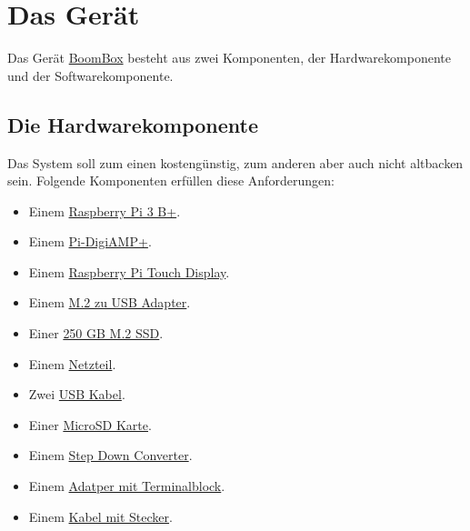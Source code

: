\documentclass[12pt,a4paper]{article}
\newcommand{\bb}{\href{https://github.com/ThirtySomething/BoomBox}{BoomBox}}
\newcommand{\rpi}{\href{https://www.raspberrypi.org/}{Raspberry Pi}\index{Raspberry Pi}}
\begin{document}
\section{Das Gerät}

Das Gerät \bb{} besteht aus zwei Komponenten, der Hardwarekomponente und der
Softwarekomponente.

\subsection{Die Hardwarekomponente}

Das System soll zum einen kostengünstig, zum anderen aber auch nicht altbacken
sein. Folgende Komponenten erfüllen diese Anforderungen:

\begin{itemize}
    \item Einem \href{https://www.raspberrypi.org/products/raspberry-pi-3-model-b-plus/}{\rpi{} 3 B+}.
    \item Einem \href{http://iqaudio.co.uk/hats/9-pi-digiamp.html}{Pi-DigiAMP+}.
    \item Einem \href{https://www.raspberrypi.org/products/raspberry-pi-touch-display/}{\rpi{} Touch Display}.
    \item Einem \href{https://www.conrad.de/de/m2-sata-ssd-erweiterungs-platine-fuer-den-raspberry-pi-1487097.html}{M.2 zu USB Adapter}.
    \item Einer \href{https://www.wd.com/de-de/products/internal-ssd/wd-blue-3d-nand-sata-ssd.html}{250 GB M.2 SSD}.
    \item Einem \href{https://www.amazon.de/gp/product/B002JIGJ4M/ref=ppx_yo_dt_b_asin_title_o04_s00?ie=UTF8&psc=1}{Netzteil}.
    \item Zwei \href{https://www.amazon.de/gp/product/B01GJC4WRO/ref=ppx_yo_dt_b_asin_title_o07_s00?ie=UTF8&psc=1}{USB Kabel}.
    \item Einer \href{https://www.amazon.de/gp/product/B073S9SFK2/ref=ppx_yo_dt_b_asin_title_o07_s00?ie=UTF8&psc=1}{MicroSD Karte}.
    \item Einem \href{https://www.amazon.de/gp/product/B07KFFNBLJ/ref=ppx_yo_dt_b_asin_title_o03_s00?ie=UTF8&psc=1}{Step Down Converter}.
    \item Einem \href{https://www.amazon.de/gp/product/B071KVWQKY/ref=ppx_yo_dt_b_asin_title_o05_s00?ie=UTF8&psc=1}{Adatper mit Terminalblock}.
    \item Einem \href{https://www.amazon.de/gp/product/B00A6QKIEQ/ref=ppx_yo_dt_b_asin_title_o06_s00?ie=UTF8&psc=1}{Kabel mit Stecker}.
\end{itemize}
\end{document}
